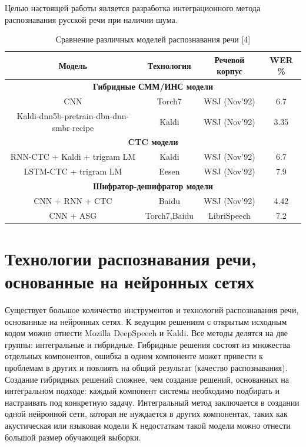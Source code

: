 \documentclass[conference]{IEEEtran}
\begin{document}
    Целью настоящей работы является разработка интеграционного метода распознавания русской речи при наличии шума.

    \begin{table}[htp]
        \caption{Сравнение различных моделей распознавания речи [4]}
        \begin{center}
            \begin{tabular}{|c|c|c|c|}
                \hline
                Модель & Технология & Речевой корпус & WER \% \\
                \hline
                \multicolumn{4}{|c|}{\textbf{Гибридные СММ/ИНС модели}} \\
                \hline
                CNN & Torch7 & WSJ (Nov’92) & 6.7 \\
                \hline
                Kaldi-dnn5b-pretrain-dbn-dnn-smbr recipe & Kaldi & WSJ (Nov’92) & 3.35 \\
                \hline
                \multicolumn{4}{|c|}{\textbf{CTC модели}} \\
                \hline
                RNN-CTC + Kaldi + trigram LM & Kaldi & WSJ (Nov’92) & 6.7 \\
                \hline
                LSTM-CTC + trigram LM & Eesen & WSJ (Nov’92) & 7.9 \\
                \hline
                \multicolumn{4}{|c|}{\textbf{Шифратор-дешифратор модели}} \\
                \hline
                CNN + RNN + CTC & Baidu & WSJ (Nov’92) & 4.42 \\
                \hline
                CNN + ASG & Torch7,Baidu & LibriSpeech & 7.2 \\
                \hline
            \end{tabular}
            \label{tab1}
        \end{center}
    \end{table}


    \section{Технологии распознавания речи, основанные на нейронных сетях}
    Существует большое количество инструментов и технологий распознавания речи, основанные на нейронных сетях.
    К ведущим решениям с открытым исходным кодом можно отнести Mozilla DeepSpeech и Kaldi.
    Все методы делятся на две группы: интегральные и гибридные.
    Гибридные решения состоят из множества отдельных компонентов, ошибка в одном компоненте может привести к проблемам в других и повлиять на общий результат (качество распознавания).
    Создание гибридных решений сложнее, чем создание решений, основанных на интегральном подходе: каждый компонент системы необходимо подбирать и настраивать под конкретную задачу.
    Интегральный метод заключается в создании одной нейронной сети, которая не нуждается в других компонентах, таких как акустическая или языковая модели
    К недостаткам такой модели можно отнести большой размер обучающей выборки.
\end{document}
